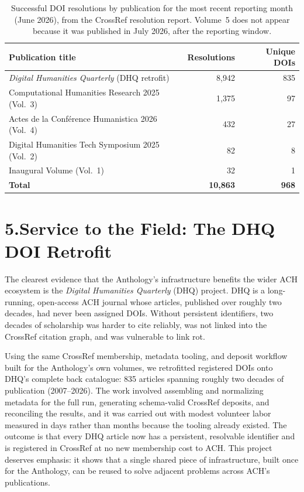 \documentclass[11pt]{article}
\begin{document}
\begin{table}[h]
\centering
\small
\begin{tabular}{p{9cm} r r}
\hline
\textbf{Publication title} & \textbf{Resolutions} & \textbf{Unique DOIs} \\
\hline
\textit{Digital Humanities Quarterly} (DHQ retrofit) & 8,942 & 835 \\
Computational Humanities Research 2025 (Vol.~3) & 1,375 & 97 \\
Actes de la Conf\'erence Humanistica 2026 (Vol.~4) & 432 & 27 \\
Digital Humanities Tech Symposium 2025 (Vol.~2) & 82 & 8 \\
Inaugural Volume (Vol.~1) & 32 & 1 \\
\hline
\textbf{Total} & \textbf{10,863} & \textbf{968} \\
\hline
\end{tabular}
\caption{Successful DOI resolutions by publication for the most recent reporting month (June 2026), from the CrossRef resolution report. Volume~5 does not appear because it was published in July 2026, after the reporting window.}
\label{tab:resbytitle}
\end{table}

\section*{5.\quad Service to the Field: The DHQ DOI Retrofit}

The clearest evidence that the Anthology's infrastructure benefits the wider ACH ecosystem is the \textit{Digital Humanities Quarterly} (DHQ) project. DHQ is a long-running, open-access ACH journal whose articles, published over roughly two decades, had never been assigned DOIs. Without persistent identifiers, two decades of scholarship was harder to cite reliably, was not linked into the CrossRef citation graph, and was vulnerable to link rot.

Using the same CrossRef membership, metadata tooling, and deposit workflow built for the Anthology's own volumes, we retrofitted registered DOIs onto DHQ's complete back catalogue: 835 articles spanning roughly two decades of publication (2007--2026). The work involved assembling and normalizing metadata for the full run, generating schema-valid CrossRef deposits, and reconciling the results, and it was carried out with modest volunteer labor measured in days rather than months because the tooling already existed. The outcome is that every DHQ article now has a persistent, resolvable identifier and is registered in CrossRef at no new membership cost to ACH. This project deserves emphasis: it shows that a single shared piece of infrastructure, built once for the Anthology, can be reused to solve adjacent problems across ACH's publications.
\end{document}
